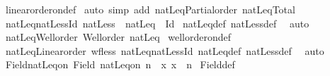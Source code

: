 \begin{isabellebody}
\isamarkupfalse%
\ linear{\isacharunderscore}{\kern0pt}order{\isacharunderscore}{\kern0pt}on{\isacharunderscore}{\kern0pt}def\isanewline
{}\isamarkupfalse%
\ {\isacharparenleft}{\kern0pt}auto\ simp\ add{\isacharcolon}{\kern0pt}\ natLeq{\isacharunderscore}{\kern0pt}Partial{\isacharunderscore}{\kern0pt}order\ natLeq{\isacharunderscore}{\kern0pt}Total{\isacharparenright}{\kern0pt}%
\endisatagproof
{\isafoldproof}%
%
\isadelimproof
\isanewline
%
\endisadelimproof
\isanewline
{}\isamarkupfalse%
\ natLeq{\isacharunderscore}{\kern0pt}natLess{\isacharunderscore}{\kern0pt}Id{\isacharcolon}{\kern0pt}\ {\isachardoublequoteopen}natLess\ {\isacharequal}{\kern0pt}\ natLeq\ {\isacharminus}{\kern0pt}\ Id{\isachardoublequoteclose}\isanewline
%
\isadelimproof
%
\endisadelimproof
%
\isatagproof
{}\isamarkupfalse%
\ natLeq{\isacharunderscore}{\kern0pt}def\ natLess{\isacharunderscore}{\kern0pt}def\ \isamarkupfalse%
\ auto%
\endisatagproof
{\isafoldproof}%
%
\isadelimproof
\isanewline
%
\endisadelimproof
\isanewline
{}\isamarkupfalse%
\ natLeq{\isacharunderscore}{\kern0pt}Well{\isacharunderscore}{\kern0pt}order{\isacharcolon}{\kern0pt}\ {\isachardoublequoteopen}Well{\isacharunderscore}{\kern0pt}order\ natLeq{\isachardoublequoteclose}\isanewline
%
\isadelimproof
%
\endisadelimproof
%
\isatagproof
{}\isamarkupfalse%
\ well{\isacharunderscore}{\kern0pt}order{\isacharunderscore}{\kern0pt}on{\isacharunderscore}{\kern0pt}def\isanewline
{}\isamarkupfalse%
\ natLeq{\isacharunderscore}{\kern0pt}Linear{\isacharunderscore}{\kern0pt}order\ wf{\isacharunderscore}{\kern0pt}less\ natLeq{\isacharunderscore}{\kern0pt}natLess{\isacharunderscore}{\kern0pt}Id\ natLeq{\isacharunderscore}{\kern0pt}def\ natLess{\isacharunderscore}{\kern0pt}def\ \isamarkupfalse%
\ auto%
\endisatagproof
{\isafoldproof}%
%
\isadelimproof
\isanewline
%
\endisadelimproof
\isanewline
{}\isamarkupfalse%
\ Field{\isacharunderscore}{\kern0pt}natLeq{\isacharunderscore}{\kern0pt}on{\isacharcolon}{\kern0pt}\ {\isachardoublequoteopen}Field\ {\isacharparenleft}{\kern0pt}natLeq{\isacharunderscore}{\kern0pt}on\ n{\isacharparenright}{\kern0pt}\ {\isacharequal}{\kern0pt}\ {\isacharbraceleft}{\kern0pt}x{\isachardot}{\kern0pt}\ x\ {\isacharless}{\kern0pt}\ n{\isacharbraceright}{\kern0pt}{\isachardoublequoteclose}\isanewline
%
\isadelimproof
%
\endisadelimproof
%
\isatagproof
{}\isamarkupfalse%
\ Field{\isacharunderscore}{\kern0pt}def\ \isamarkupfalse%

\end{isabellebody}
